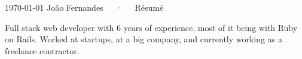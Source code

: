 \documentclass[11pt, a4paper]{awesome-cv}
\begin{document}
\makecvheader[C]

\makecvfooter
  {\today}
  {João Fernandes~~~·~~~Résumé}
  {\thepage}




\begin{cvparagraph}

Full stack web developer with 6 years of experience, most of it being with Ruby on Rails.
Worked at startups, at a big company, and currently working as a freelance contractor.
\end{cvparagraph}


\end{document}
